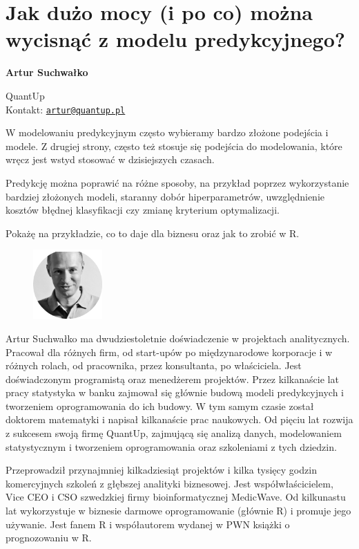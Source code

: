 \documentclass[\main/boa.tex]{subfiles}
\begin{document}
\section{Jak dużo mocy (i po co) można wycisnąć z modelu predykcyjnego?}


\begin{minipage}{0.915\textwidth}
	\centering
  {\bf \LARGE {} Artur Suchwałko}
\end{minipage}


\begin{affiliations}
\begin{minipage}{0.915\textwidth}
\centering
\large QuantUp \\[1pt]
Kontakt: \href{mailto:artur@quantup.pl}{\nolinkurl{artur@quantup.pl}}\\
\end{minipage}
\end{affiliations}


W modelowaniu predykcyjnym często wybieramy bardzo złożone podejścia i modele. Z drugiej strony, często też stosuje się podejścia do modelowania, które wręcz jest wstyd stosować w dzisiejszych czasach.

Predykcję można poprawić na różne sposoby, na przykład poprzez wykorzystanie bardziej złożonych modeli, staranny dobór hiperparametrów, uwzględnienie kosztów błędnej klasyfikacji czy zmianę kryterium optymalizacji.

Pokażę na przykładzie, co to daje dla biznesu oraz jak to zrobić w R.

\bio
\begin{figure}
    \includegraphics[width=100px]{img/guests/czarno_biale/artur.png}
\end{figure} 
Artur Suchwałko ma dwudziestoletnie doświadczenie w projektach analitycznych. Pracował dla różnych firm, od start-upów po międzynarodowe korporacje i w różnych rolach, od pracownika, przez konsultanta, po właściciela. Jest doświadczonym programistą oraz menedżerem projektów. Przez kilkanaście lat pracy statystyka w banku zajmował się głównie budową modeli predykcyjnych i tworzeniem oprogramowania do ich budowy. W tym samym czasie został doktorem matematyki i napisał kilkanaście prac naukowych. Od pięciu lat rozwija z sukcesem swoją firmę QuantUp, zajmującą się analizą danych, modelowaniem statystycznym i tworzeniem oprogramowania oraz szkoleniami z tych dziedzin.

Przeprowadził przynajmniej kilkadziesiąt projektów i kilka tysięcy godzin komercyjnych szkoleń z głębszej analityki biznesowej. Jest współwłaścicielem, Vice CEO i CSO szwedzkiej firmy bioinformatycznej MedicWave. Od kilkunastu lat wykorzystuje w biznesie darmowe \break oprogramowanie (głównie R) i promuje jego używanie. Jest fanem R i współautorem wydanej w PWN książki o prognozowaniu w R.
\end{document}
